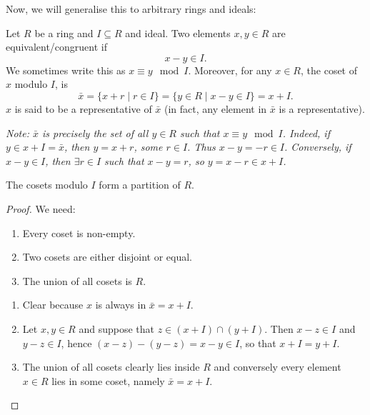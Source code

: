 \documentclass[10pt, a4paper]{article}
\begin{document}
Now,
we will generalise this to arbitrary rings and ideals:

\begin{definition}
    Let $R$ be a ring and $I \subseteq R$ and ideal.
    Two elements $x, y \in R$ are equivalent/congruent if
    \[
    x - y \in I.
    \]
    We sometimes write this as $x \equiv y \mod{I}$.
    Moreover,
    for any $x \in R$,
    the coset of $x$ modulo $I$,
    is
    \[
    \bar{x} = \{x + r \mid r \in I\} = \{y \in R \mid x - y \in I\} = x + I.
    \]
    $x$ is said to be a representative of $\bar{x}$
    (in fact,
    any element in $\bar{x}$ is a representative).
\end{definition}

\textit{Note:
$\bar{x}$ is precisely the set of all $y \in R$ such that $x \equiv y\mod{I}$.
Indeed,
if $y \in x + I = \bar{x}$,
then $y = x + r$,
some $r \in I$.
Thus $x - y = -r \in I$.
Conversely,
if $x - y \in I$,
then $\exists r \in I$ such that $x - y = r$,
so $y = x - r \in x + I$.}

\begin{lemma}
    The cosets modulo $I$ form a partition of $R$.

    \begin{proof}
        We need:
        \begin{enumerate}[label = \arabic*)]
            \item Every coset is non-empty.

            \item Two cosets are either disjoint or equal.

            \item The union of all cosets is $R$.
        \end{enumerate}

        
        \begin{enumerate}[label = \arabic*)]
            \item Clear because $x$ is always in $\bar{x} = x + I$.

            \item Let $x, y \in R$ and suppose that $z \in (x + I) \cap (y + I)$.
            Then $x - z \in I$ and $y - z \in I$,
            hence $(x - z) - (y - z) = x - y \in I$,
            so that $x + I = y + I$.

            \item The union of all cosets clearly lies inside $R$ and conversely every element $x \in R$ lies in some coset,
            namely $\bar{x} = x + I$.
        \end{enumerate}
    \end{proof}
\end{lemma}
\end{document}

